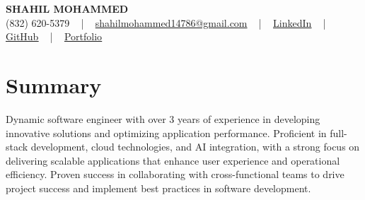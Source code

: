 \documentclass[letterpaper,10pt]{article}
\begin{document}
\begin{center}
    {\fontsize{14pt}{12pt}\selectfont \textbf{\MakeUppercase{Shahil Mohammed}}}\\ \vspace{2pt}
    \fontsize{10pt}{12pt}\selectfont (832) 620-5379 ~ | ~ \href{mailto:shahilmohammed14786@gmail.com}{shahilmohammed14786@gmail.com} ~ | ~  
    \href{https://www.linkedin.com/in/shahil-mohammed-9652931a1/}{\color{blue}\underline{LinkedIn}}  ~ | ~ 
    \href{https://github.com/freakbeast14}{\color{blue}\underline{GitHub}} ~ | ~ 
    \href{https://shahil-mohammed.netlify.app/}{\color{blue}\underline{Portfolio}}
    \vspace{-8pt}
\end{center}

\section{Summary}
\vspace{-2pt}\fontsize{8pt}{9pt}\selectfont
Dynamic software engineer with over 3 years of experience in developing innovative solutions and optimizing application performance. Proficient in full-stack development, cloud technologies, and AI integration, with a strong focus on delivering scalable applications that enhance user experience and operational efficiency. Proven success in collaborating with cross-functional teams to drive project success and implement best practices in software development.
 \vspace{-5pt}
 
\vspace{-2pt}
\end{document}
